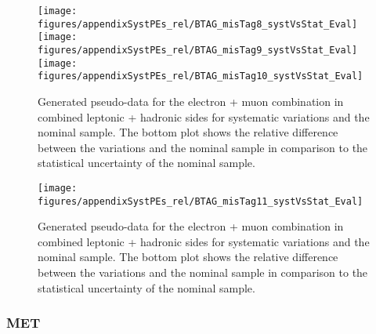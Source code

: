 \begin{figure}[!hb]
\begin{center}
        \texttt{[image: figures/appendixSystPEs\_rel/BTAG\_misTag8\_systVsStat\_Eval]}\\
        \texttt{[image: figures/appendixSystPEs\_rel/BTAG\_misTag9\_systVsStat\_Eval]}\\
        \texttt{[image: figures/appendixSystPEs\_rel/BTAG\_misTag10\_systVsStat\_Eval]}\\

        \caption{Generated pseudo-data for the electron + muon combination in combined leptonic + hadronic sides for systematic variations and the nominal \ttbar sample. The bottom plot shows the relative difference between the variations and the nominal sample in comparison to the statistical uncertainty of the nominal sample.}   
        \label{fig:systematicVar_lephad_Btag_4_1}
        \end{center}                          
        \end{figure}

\begin{figure}[!hb]
\begin{center}
        \texttt{[image: figures/appendixSystPEs\_rel/BTAG\_misTag11\_systVsStat\_Eval]}\\

        \caption{Generated pseudo-data for the electron + muon combination in combined leptonic + hadronic sides for systematic variations and the nominal \ttbar sample. The bottom plot shows the relative difference between the variations and the nominal sample in comparison to the statistical uncertainty of the nominal sample.}   
        \label{fig:systematicVar_lephad_Btag_4_2}
        \end{center}                          
        \end{figure}




\clearpage
\subsubsection{MET}

